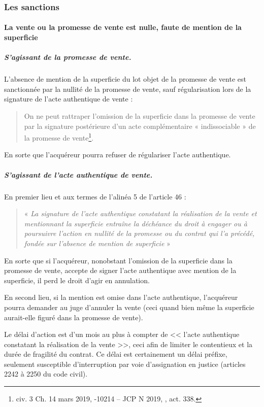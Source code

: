 		\subsubsection{Les sanctions}
			
			\paragraph{La vente ou la promesse de vente est nulle, faute de mention de la superficie}
			
				\subparagraph{S’agissant de la promesse de vente.}
				
				L’absence de mention de la superficie du lot objet de la promesse de vente est sanctionnée par la nullité
				de la promesse de vente, sauf régularisation lors de la signature de l’acte authentique de vente :
				\begin{quote}
					On ne peut rattraper l’omission de la superficie dans la promesse de vente par la signature postérieure
					d’un acte complémentaire « indissociable » de la promesse de vente\footnote{civ. 3\ieme{} Ch. 14 mars 2019, -10214 – JCP N 2019, , act. 338.}.
				\end{quote}
				En sorte que l’acquéreur pourra refuser de régulariser l’acte authentique.
				
				\subparagraph{S’agissant de l’acte authentique de vente.}
				
				\par En premier lieu et aux termes de l’alinéa 5 de l’article 46 :
				\begin{quote}
					« \emph{La signature de l'acte authentique constatant la réalisation de la vente et mentionnant la
				superficie entraîne la déchéance du droit à engager ou à poursuivre l'action en nullité de la promesse
				ou du contrat qui l'a précédé, fondée sur l'absence de mention de superficie} »
				\end{quote}
				
				En sorte que si l’acquéreur, nonobstant l’omission de la superficie dans la promesse de vente, accepte de
				signer l’acte authentique avec mention de la superficie, il perd le droit d’agir en annulation.
				
				\bigskip
				En second lieu, si la mention est omise dans l’acte authentique, l’acquéreur pourra demander au juge
				d’annuler la vente (ceci quand bien même la superficie aurait-elle figuré dans la promesse de vente).
				
				Le délai d'action est d'un mois au plus à compter de << l'acte authentique constatant la réalisation de la
				vente >>, ceci afin de limiter le contentieux et la durée de fragilité du contrat. Ce délai est certainement un
				délai préfixe, seulement susceptible d'interruption par voie d’assignation en justice (articles 2242 à 2250
				du code civil).
				
